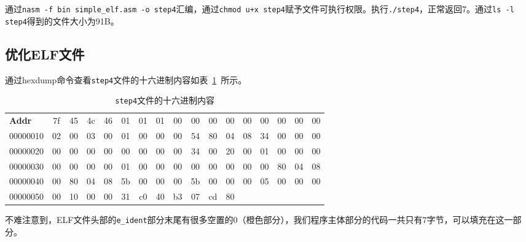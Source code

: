 \documentclass[a4paper, 11pt]{ctexart}
\begin{document}
通过\texttt{nasm -f bin simple\_elf.asm -o step4}汇编，通过\texttt{chmod u+x step4}赋予文件可执行权限。执行\texttt{./step4}，正常返回7。通过\texttt{ls -l step4}得到的文件大小为91B。

\subsection{优化ELF文件}

通过hexdump命令查看\texttt{step4}文件的十六进制内容如表~\ref{tab:step4_hex}\ 所示。

\begingroup
\begin{table}[htbp]
    \centering
    \setlength{\tabcolsep}{4pt}
    \begin{ttfamily}
    \begin{tabular}{l|*{16}{>{\columncolor{white}}c}}
    \textbf{Addr} &
    7f & 45 & 4c & 46 & 01 & 01 & 01 & 00 &
    00 & \cellcolor{hlorange}00 & \cellcolor{hlorange}00 & \cellcolor{hlorange}00 & \cellcolor{hlorange}00 & \cellcolor{hlorange}00 & \cellcolor{hlorange}00 & \cellcolor{hlorange}00 \\
    00000010 &
    02 & 00 & 03 & 00 & 01 & 00 & 00 & 00 &
    54 & 80 & 04 & 08 & 34 & 00 & 00 & 00 \\
    00000020 &
    00 & 00 & 00 & 00 & 00 & 00 & 00 & 00 &
    34 & 00 & 20 & 00 & \cellcolor{hlblue}01 & \cellcolor{hlblue}00 & \cellcolor{hlblue}00 & \cellcolor{hlblue}00 \\
    00000030 &
    \cellcolor{hlblue}00 & \cellcolor{hlblue}00 & \cellcolor{hlblue}00 & \cellcolor{hlblue}00 &
    \cellcolor{hlgreen}01 & \cellcolor{hlgreen}00 & \cellcolor{hlgreen}00 & \cellcolor{hlgreen}00 &
    \cellcolor{hlgreen}00 & \cellcolor{hlgreen}00 & \cellcolor{hlgreen}00 & \cellcolor{hlgreen}00 &
    00 & 80 & 04 & 08 \\
    00000040 &
    00 & 80 & 04 & 08 & 5b & 00 & 00 & 00 &
    5b & 00 & 00 & 00 & 05 & 00 & 00 & 00 \\
    00000050 &
    00 & 10 & 00 & 00 & 31 & c0 & 40 & b3 &
    07 & cd & 80 & & & & & \\
    \end{tabular}
    \end{ttfamily}
    \caption{\texttt{step4}文件的十六进制内容}
    \label{tab:step4_hex}
\end{table}
\endgroup

不难注意到，ELF文件头部的\texttt{e\_ident}部分末尾有很多空置的0（橙色部分），我们程序主体部分的代码一共只有7字节，可以填充在这一部分。
\end{document}
